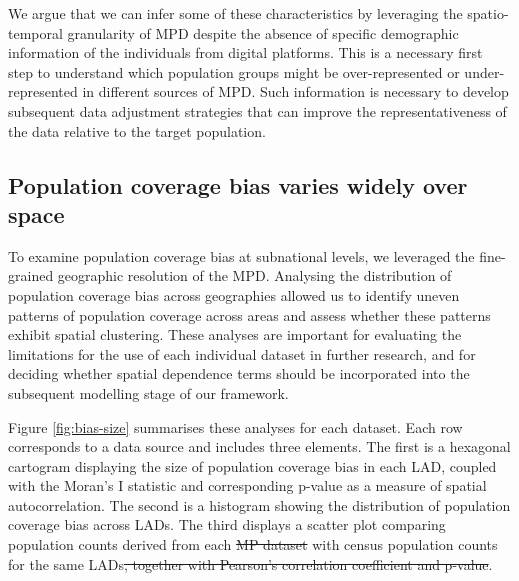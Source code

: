 \documentclass[]{rsos}%
\providecommand{\DIFadd}[1]{{\protect\color{blue}\uwave{#1}}} %
\providecommand{\DIFdel}[1]{{\protect\color{red}\sout{#1}}}                      %
\providecommand{\DIFaddbegin}{} %
\providecommand{\DIFaddend}{} %
\providecommand{\DIFdelbegin}{} %
\providecommand{\DIFdelend}{} %
\begin{document}
We argue that we can infer some of these characteristics by leveraging
the spatio-temporal granularity of MPD despite the absence of specific
demographic information of the individuals from digital platforms. This
is a necessary first step to understand which population groups might be
over-represented or under-represented in different sources of MPD. Such
information is necessary to develop subsequent data adjustment
strategies that can improve the representativeness of the data relative
to the target population.

\subsection{Population coverage bias varies widely over space}\label{population-coverage-bias-varies-widely-over-space}

To examine population coverage bias at subnational levels, we leveraged
the fine-grained geographic resolution of the MPD. Analysing the
distribution of population coverage bias across geographies allowed us
to identify uneven patterns of population coverage across areas and
assess whether these patterns exhibit spatial clustering. These analyses
are important for evaluating the limitations for the use of each
individual dataset in further research, and for deciding whether spatial
dependence terms should be incorporated into the subsequent modelling
stage of our framework.

Figure \ref{fig:bias-size} summarises these analyses for each dataset.
Each row corresponds to a data source and includes three elements. The
first is a hexagonal cartogram displaying the size of population
coverage bias in each LAD, coupled with the Moran's I statistic and
corresponding p-value as a measure of spatial autocorrelation. The
second is a histogram showing the distribution of population coverage
bias across LADs. The third displays a scatter plot comparing population
counts derived from each \DIFdelbegin \DIFdel{MP dataset }\DIFdelend \DIFaddbegin \DIFadd{MPD }\DIFaddend with census population counts for the same
LADs\DIFdelbegin \DIFdel{, together with Pearson's correlation coefficient and
p-value}\DIFdelend .
\end{document}
